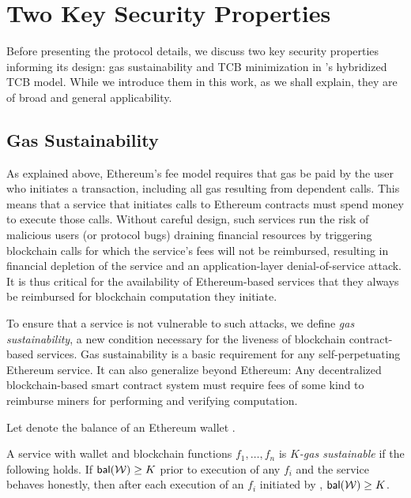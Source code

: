 \section{Two Key Security Properties}

Before presenting the \tc protocol details, we discuss two key security properties informing its design: gas sustainability and TCB minimization in \tc's hybridized TCB model. While we introduce them in this work, as we shall explain, they are of broad and general applicability.

\subsection{Gas Sustainability}
\label{sec:gas-sustainability}

As explained above, Ethereum's fee model requires that gas be paid by the user who initiates a transaction, including all gas resulting from dependent calls. 
This means that a service that initiates calls to Ethereum contracts must spend money to execute those calls.
Without careful design, such services run the risk of malicious users (or protocol bugs) draining financial resources by triggering blockchain calls for which the service's fees will not be reimbursed, resulting in financial depletion of the service and an application-layer denial-of-service attack.
It is thus critical for the availability of Ethereum-based services that they always be reimbursed for blockchain computation they initiate.

To ensure that a service is not vulnerable to such attacks, we define \emph{gas sustainability}, a new condition necessary for the liveness of blockchain contract-based services. Gas sustainability is a basic requirement for any self-perpetuating Ethereum service. It can also generalize beyond Ethereum: Any decentralized blockchain-based smart contract system must require fees of some kind to reimburse miners for performing and verifying computation. 

Let \bal{\wallet} denote the balance of an Ethereum wallet \wallet.

\begin{definition}
  \label{def:gas-sustainability}
  A service with wallet \wallet and blockchain functions $f_1, \dotsc, f_n$ is \emph{$K$-gas sustainable} if the following holds.
If $\bal{\wallet} \geq K$ prior to execution of any $f_i$ and the service behaves honestly,
  then after each execution of an $f_i$ initiated by \wallet, $\bal{\wallet} \geq K$.
\end{definition}

